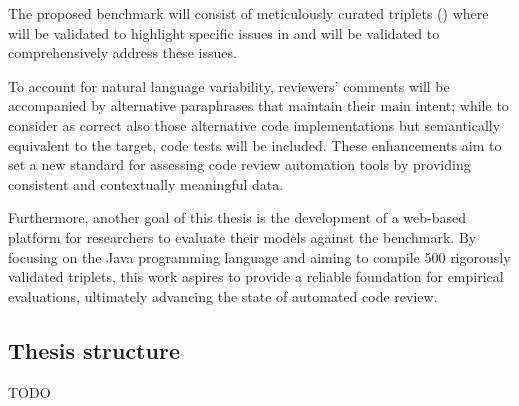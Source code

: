 The proposed benchmark will consist of meticulously curated triplets (\subCode)
where \revComment will be validated to highlight specific issues in \subCode and
\revCode will be validated to comprehensively address these issues.

To account for natural language variability, reviewers' comments will be accompanied by
alternative paraphrases that maintain their main intent; while to consider as correct also
those alternative code implementations but semantically equivalent to the target, code tests will
be included. These enhancements aim to set a new standard for assessing code review
automation tools by providing consistent and contextually meaningful data.

Furthermore, another goal of this thesis is the development of a web-based platform for researchers to
evaluate their models against the benchmark. By focusing on the Java
programming language and aiming to compile 500 rigorously validated triplets,
this work aspires to provide a reliable foundation for empirical evaluations,
ultimately advancing the state of automated code review.

\subsection{Thesis structure}

{\color{red} TODO}

